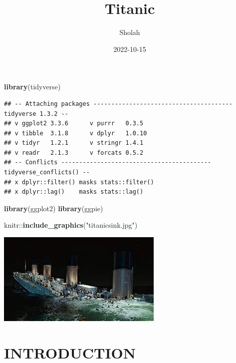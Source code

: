 \documentclass[
]{article}
\title{Titanic}
\author{Sholah}
\date{2022-10-15}
\newenvironment{Shaded}{\begin{snugshade}}{\end{snugshade}}
\newcommand{\FunctionTok}[1]{\textcolor[rgb]{1.00,0.58,0.35}{\textbf{#1}}}
\newcommand{\NormalTok}[1]{\textcolor[rgb]{0.74,0.68,0.62}{#1}}
\newcommand{\SpecialCharTok}[1]{\textcolor[rgb]{0.02,0.61,0.04}{#1}}
\newcommand{\StringTok}[1]{\textcolor[rgb]{0.02,0.61,0.04}{#1}}
\begin{document}
\maketitle

{
\setcounter{tocdepth}{2}
\tableofcontents
}
\begin{Shaded}
\begin{Highlighting}[]
\FunctionTok{library}\NormalTok{(tidyverse)}
\end{Highlighting}
\end{Shaded}

\begin{verbatim}
## -- Attaching packages --------------------------------------- tidyverse 1.3.2 --
## v ggplot2 3.3.6      v purrr   0.3.5 
## v tibble  3.1.8      v dplyr   1.0.10
## v tidyr   1.2.1      v stringr 1.4.1 
## v readr   2.1.3      v forcats 0.5.2 
## -- Conflicts ------------------------------------------ tidyverse_conflicts() --
## x dplyr::filter() masks stats::filter()
## x dplyr::lag()    masks stats::lag()
\end{verbatim}

\begin{Shaded}
\begin{Highlighting}[]
\FunctionTok{library}\NormalTok{(ggplot2)}
\FunctionTok{library}\NormalTok{(ggpie)}
\end{Highlighting}
\end{Shaded}

\begin{Shaded}
\begin{Highlighting}[]
\NormalTok{knitr}\SpecialCharTok{::}\FunctionTok{include\_graphics}\NormalTok{(}\StringTok{"titanicsink.jpg"}\NormalTok{)}
\end{Highlighting}
\end{Shaded}

\includegraphics{titanicsink.jpg}

\hypertarget{introduction}{%
\section{INTRODUCTION}\label{introduction}}
\end{document}
